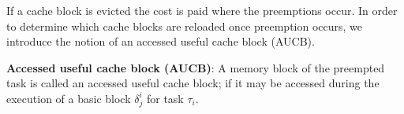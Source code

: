 \noindent
If a cache block is evicted the cost is paid where the preemptions occur.  In order to determine which cache blocks are reloaded once preemption occurs, we introduce the notion of an accessed useful cache block (AUCB).

\begin{definition}
\textbf{Accessed useful cache block (AUCB)}: A memory block of the preempted task is called an accessed useful cache block; if it may be accessed during the execution of a basic block \begin{math}\delta_{j}^{i}\end{math} for task \begin{math}\tau_{i}\end{math}.
\end{definition}

